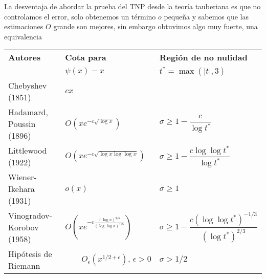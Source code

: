 \begin{note}
    La desventaja de abordar la prueba del TNP desde la teoría tauberiana es que no controlamos el error, solo obtenemos un término $o$ pequeña y sabemos que las estimaciones $O$ grande son mejores, sin embargo obtuvimos algo muy fuerte, una equivalencia

\begin{center}
    \begin{table}[h!]
\begin{tabular}{|l|l|l|}
\hline
\hspace{1.5cm}\textbf{Autores} & \hspace{1.3cm}\textbf{Cota para} & \hspace{0.2cm}\textbf{Región de no nulidad} \\
 & \hspace*{1.35cm}\textbf{$\psi(x) - x$}& \hspace{0.7cm}$t^* = \max(|t|, 3)$\\
 \hline
Chebyshev (1851) & \hspace{2.2cm}$cx$ &  \\
\hline
Hadamard, Poussin (1896) & \quad\quad$O\left( \displaystyle xe^{\displaystyle-c\sqrt{\log x}} \right)$ & $\sigma \geq 1 - \dfrac{c}{\log t^*}$ \\ \hline
Littlewood (1922) & $O\left( \displaystyle xe^{\displaystyle-c\sqrt{\log x \log \log x}} \right)$ & $\sigma \geq 1 - \dfrac{c \log \log t^*}{\log t^*}$ \\ \hline
Wiener-Ikehara (1931) & \hspace{2.05cm}$o(x)$ & $\sigma \geq 1$ \\ \hline
Vinogradov-Korobov (1958) &\hspace{0.16cm} $O\left( xe^{-c \displaystyle\frac{(\log x)^{3/5}}{(\log \log x)^{1/5}}} \right)$ & $\sigma \geq 1 - \dfrac{c (\log \log t^*)^{-1/3}}{(\log t^*)^{2/3}}$ \\ \hline
Hipótesis de Riemann & $\displaystyle \quad\quad O_\epsilon(x^{1/2+\epsilon}), \, \epsilon > 0$ & $\sigma > 1/2$ \\ \hline
\end{tabular}
\end{table}

\end{center}
\end{note}

